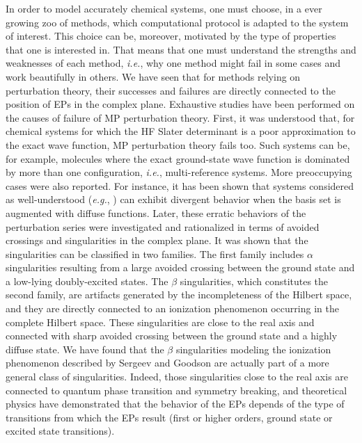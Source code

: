 \documentclass[aps,prb,reprint,noshowkeys,superscriptaddress]{revtex4-1}
\newcommand{\ie}{\textit{i.e.}}
\newcommand{\eg}{\textit{e.g.}}
\begin{document}
In order to model accurately chemical systems, one must choose, in a ever growing zoo of methods, which computational protocol is adapted to the system of interest.
This choice can be, moreover, motivated by the type of properties that one is interested in.
That means that one must understand the strengths and weaknesses of each method, \ie, why one method might fail in some cases and work beautifully in others. 
We have seen that for methods relying on perturbation theory, their successes and failures are directly connected to the position of EPs in the complex plane. 
Exhaustive studies have been performed on the causes of failure of MP perturbation theory. 
First, it was understood that, for chemical systems for which the HF Slater determinant is a poor approximation to the exact wave function, MP perturbation theory fails too. Such systems can be, for example, molecules where the exact ground-state wave function is dominated by more than one configuration, \ie, multi-reference systems. 
More preoccupying cases were also reported. 
For instance, it has been shown that systems considered as well-understood (\eg, ) can exhibit divergent behavior when the basis set is augmented with diffuse functions. 
Later, these erratic behaviors of the perturbation series were investigated and rationalized in terms of avoided crossings and singularities in the complex plane. It was shown that the singularities can be classified in two families. 
The first family includes $\alpha$ singularities resulting from a large avoided crossing between the ground state and a low-lying doubly-excited states. 
The $\beta$ singularities, which constitutes the second family, are artifacts generated by the incompleteness of the Hilbert space, and they are directly connected to an ionization phenomenon occurring in the complete Hilbert space. 
These singularities are close to the real axis and connected with sharp avoided crossing between the ground state and a highly diffuse state. 
We have found that the $\beta$ singularities modeling the ionization phenomenon described by Sergeev and Goodson are actually part of a more general class of singularities. Indeed, those singularities close to the real axis are connected to quantum phase transition and symmetry breaking, and theoretical physics have demonstrated that the behavior of the EPs depends of the type of transitions from which the EPs result (first or higher orders, ground state or excited state transitions).
\end{document}
